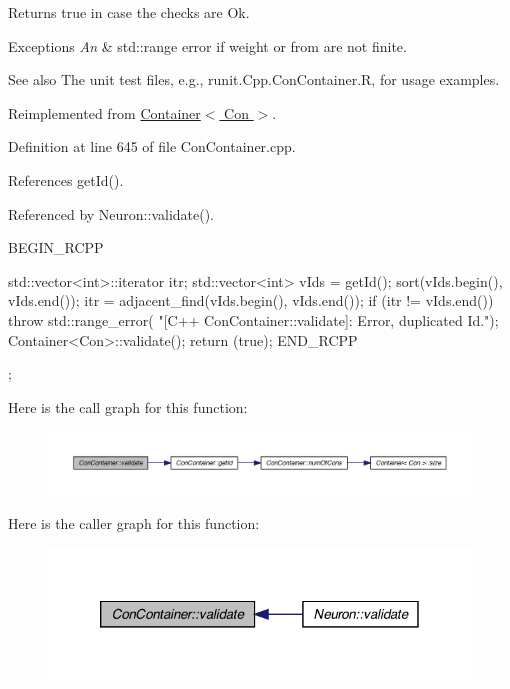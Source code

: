 \begin{DoxyReturn}{Returns}
true in case the checks are Ok.
\end{DoxyReturn}

\begin{DoxyExceptions}{Exceptions}
{\em An} & std::range error if weight or from are not finite.\\
\hline
\end{DoxyExceptions}
\begin{DoxySeeAlso}{See also}
The unit test files, e.g., runit.Cpp.ConContainer.R, for usage examples. 
\end{DoxySeeAlso}


Reimplemented from \hyperlink{class_container_aa99a036fd0fe6d6b82ba558157e557d3}{Container$<$ Con $>$}.



Definition at line 645 of file ConContainer.cpp.



References getId().



Referenced by Neuron::validate().


\begin{DoxyCode}
{
  BEGIN_RCPP

  std::vector<int>::iterator itr;
  std::vector<int> vIds = getId();
  sort(vIds.begin(), vIds.end());
  itr = adjacent_find(vIds.begin(), vIds.end());
  if (itr != vIds.end())
    throw std::range_error(
        "[C++ ConContainer::validate]: Error, duplicated Id.");
  Container<Con>::validate();
  return (true);
END_RCPP};
\end{DoxyCode}


Here is the call graph for this function:\nopagebreak
\begin{figure}[H]
\begin{center}
\leavevmode
\includegraphics[width=400pt]{class_con_container_aac12a3d3604db9ff715503816109470c_cgraph}
\end{center}
\end{figure}




Here is the caller graph for this function:\nopagebreak
\begin{figure}[H]
\begin{center}
\leavevmode
\includegraphics[width=320pt]{class_con_container_aac12a3d3604db9ff715503816109470c_icgraph}
\end{center}
\end{figure}




